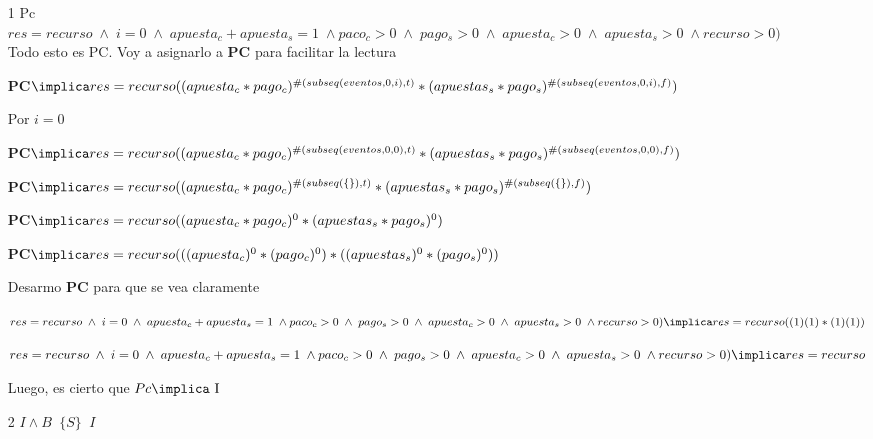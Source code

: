 \documentclass[10pt,a4paper]{article}
\begin{document}
\begin{itemize}[leftmargin=*]
    \item [1] {Pc \implica {}}\vspace{0.3cm}\\
$res = recurso \phantom{.} \wedge \phantom{.} i = 0 \phantom{.} \wedge \phantom{.} apuesta_c + apuesta_s = 1 \phantom{.} \wedge paco_c > 0 \phantom{.} \wedge \phantom{.} pago_s > 0 \phantom{.} \wedge \phantom{.} apuesta_c > 0 \phantom{.} \wedge \phantom{.} apuesta_s > 0 \phantom{.} \wedge recurso > 0)$ \\
Todo esto es PC. Voy a asignarlo a \textbf{PC} para facilitar la lectura

\textbf{PC}$ \implica res = recurso((apuesta_c * pago_c)^{\#(subseq(eventos,0,i), t)} * (apuestas_s * pago_s)^{\#(subseq(eventos,0,i), f)})$

Por $i = 0$

\textbf{PC}$ \implica res = recurso((apuesta_c * pago_c)^{\#(subseq(eventos,0,0), t)} * (apuestas_s * pago_s)^{\#(subseq(eventos,0,0), f)})$


\textbf{PC}$ \implica res = recurso((apuesta_c * pago_c)^{\#(subseq(\{\}), t)} * (apuestas_s * pago_s)^{\#(subseq(\{\}), f)})$

\textbf{PC}$ \implica res = recurso((apuesta_c * pago_c)^{0} * (apuestas_s * pago_s)^{0})$

\textbf{PC}$ \implica res = recurso(((apuesta_c)^{0} * (pago_c)^{0}) * ((apuestas_s)^{0} * (pago_s)^{0}))$

Desarmo \textbf{PC} para que se vea claramente

$res = recurso \phantom{.} \wedge \phantom{.} i = 0 \phantom{.} \wedge \phantom{.} apuesta_c + apuesta_s = 1 \phantom{.} \wedge paco_c > 0 \phantom{.} \wedge \phantom{.} pago_s > 0 \phantom{.} \wedge \phantom{.} apuesta_c > 0 \phantom{.} \wedge \phantom{.} apuesta_s > 0 \phantom{.} \wedge recurso > 0) \implica res = recurso((1)(1) * (1)(1))$

$res = recurso \phantom{.} \wedge \phantom{.} i = 0 \phantom{.} \wedge \phantom{.} apuesta_c + apuesta_s = 1 \phantom{.} \wedge paco_c > 0 \phantom{.} \wedge \phantom{.} pago_s > 0 \phantom{.} \wedge \phantom{.} apuesta_c > 0 \phantom{.} \wedge \phantom{.} apuesta_s > 0 \phantom{.} \wedge recurso > 0) \implica res = recurso$

Luego, es cierto que $Pc \implica \text{ I}$

    \item [2] ${I \wedge B \phantom{a} \{S\} \phantom{a} I}$\vspace{0.3cm} \\
    

\end{itemize}
\end{document}
